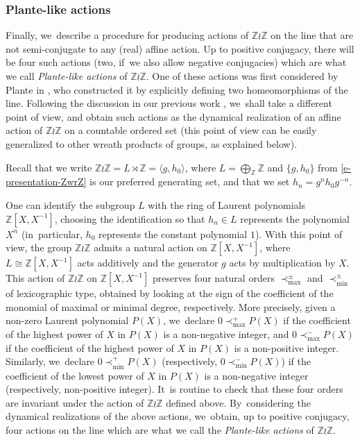 \documentclass[JEP,XML,SOM,Unicode,NoFloatCountersInSection,published]{cedram}
\theoremstyle{definition}
\newcommand{\Z}{\mathbb Z}
\begin{document}
\subsubsection{Plante-like actions}
\label{ssc.plante} Finally, we~describe a procedure for producing actions of $\Z\wr\Z$ on the line that are not semi-conjugate to any (real) affine action. Up to positive conjugacy, there will be four such actions (two, if~we also allow negative conjugacies) which are what we call \emph{Plante-like actions} of $\Z\wr\Z$. One of these actions was first considered by Plante in \cite{Plante}, who constructed it by explicitly defining two homeomorphisms of the line. Following the discussion in our previous work \cite[Ex.\,8.1.8]{BMRT}, we~shall take a different point of view, and obtain such actions as the dynamical realization of an affine action of $\Z\wr\Z$ on a countable ordered set (this point of view can be easily generalized to other wreath products of groups, as explained below).

Recall that we write $\Z \wr \Z=L\rtimes \Z=\langle g,h_0\rangle$, where $L=\bigoplus_\Z \Z$ and $\{ g, h_0\}$ from \eqref{e-presentation-ZwrZ} is our preferred generating set, and that we set $h_n=g^n h_0 g^{-n}$.

One can identify the subgroup $L$ with the ring of Laurent polynomials $\Z[X,X^{-1}]$, choosing the identification so that $h_n\in L$ represents the polynomial $ X^n$ (in~particular, $h_0$ represents the constant polynomial $1$). With this point of view, the group $\Z\wr\Z$ admits a natural action on $\Z[X,X^{-1}]$, where $L\cong \Z[X,X^{-1}]$ acts additively and the generator $g$ acts by multiplication by $X$. This action of $\Z \wr \Z$ on $\Z[X,X^{-1}]$ preserves four natural orders $\prec_{\max}^\pm$ and $\prec_{\min}^\pm$ of lexicographic type, obtained by looking at the sign of the coefficient of the monomial of maximal or minimal degree, respectively. More precisely, given a non-zero Laurent polynomial
$P(X)$, we~declare $0\prec_{\max}^+ P(X)$ if the coefficient of the highest power of $X$ in $P(X)$ is a non-negative integer, and $0\prec_{\max}^- P(X)$ if the coefficient of the highest power of $X$ in $P(X)$ is a non-positive integer. Similarly, we~declare $0\prec_{\min}^+ P(X)$ (respectively, $0\prec_{\min}^- P(X)$) if the coefficient of the lowest power of $X$ in $P(X)$ is a non-negative integer (respectively, non-positive integer). It~is routine to check that these four orders are invariant under the action of $\Z \wr \Z$ defined above. By~considering the dynamical realizations of the above actions, we~obtain, up to positive conjugacy, four actions on the line which are what we call the \emph{Plante-like actions} of $\Z \wr\Z$.
\end{document}
